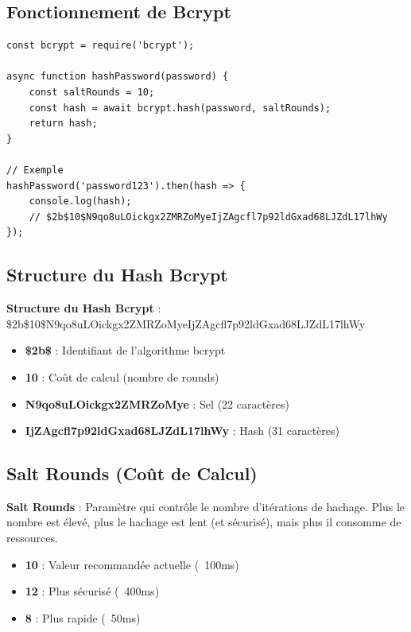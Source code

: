 \subsection{Fonctionnement de Bcrypt}

\begin{lstlisting}[style=javascript, caption=Hachage avec bcrypt]
const bcrypt = require('bcrypt');

async function hashPassword(password) {
    const saltRounds = 10;
    const hash = await bcrypt.hash(password, saltRounds);
    return hash;
}

// Exemple
hashPassword('password123').then(hash => {
    console.log(hash);
    // $2b$10$N9qo8uLOickgx2ZMRZoMyeIjZAgcfl7p92ldGxad68LJZdL17lhWy
});
\end{lstlisting}

\subsection{Structure du Hash Bcrypt}

\begin{definitionbox}
    \textbf{Structure du Hash Bcrypt} : \$2b\$10\$N9qo8uLOickgx2ZMRZoMyeIjZAgcfl7p92ldGxad68LJZdL17lhWy
    \begin{itemize}
        \item \textbf{\$2b\$} : Identifiant de l'algorithme bcrypt
        \item \textbf{10} : Coût de calcul (nombre de rounds)
        \item \textbf{N9qo8uLOickgx2ZMRZoMye} : Sel (22 caractères)
        \item \textbf{IjZAgcfl7p92ldGxad68LJZdL17lhWy} : Hash (31 caractères)
    \end{itemize}
\end{definitionbox}

\subsection{Salt Rounds (Coût de Calcul)}

\begin{definitionbox}
    \textbf{Salt Rounds} : Paramètre qui contrôle le nombre d'itérations de hachage. Plus le nombre est élevé, plus le hachage est lent (et sécurisé), mais plus il consomme de ressources.
\end{definitionbox}

\begin{itemize}
    \item \textbf{10} : Valeur recommandée actuelle (~100ms)
    \item \textbf{12} : Plus sécurisé (~400ms)
    \item \textbf{8} : Plus rapide (~50ms)
\end{itemize}

